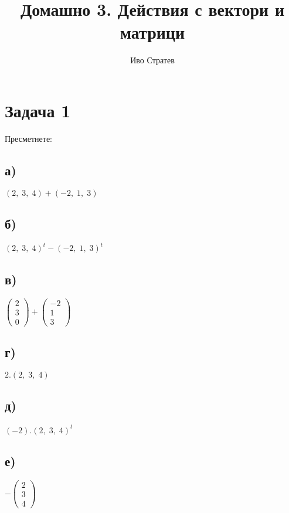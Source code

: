 \documentclass[12pt]{article}
\title{Домашно 3. Действия с вектори и матрици}
\author{Иво Стратев}
\begin{document}
\maketitle

\section*{Задача 1}

Пресметнете:

\subsection*{а)}

$(2, \; 3, \; 4) + (-2, \; 1, \; 3)$

\subsection*{б)}

$(2, \; 3, \; 4)^t - (-2, \; 1, \; 3)^t$

\subsection*{в)}

$\begin{pmatrix} 2 \\ 3 \\ 0 \end{pmatrix} + \begin{pmatrix} -2 \\ 1 \\ 3 \end{pmatrix}$

\subsection*{г)}
    
$2.(2, \; 3, \; 4)$
    
\subsection*{д)}
    
$(-2).(2, \; 3, \; 4)^t$
    
\subsection*{е)}
    
$-\begin{pmatrix} 2 \\ 3 \\ 4 \end{pmatrix}$
\end{document}
